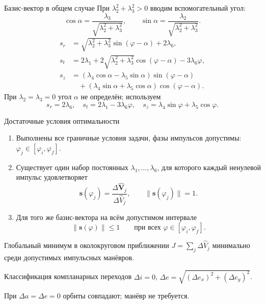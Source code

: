 \documentclass[11pt,aspectratio=169,t]{beamer}
\newcommand{\derivationmathspacing}{%
  \setlength{\abovedisplayskip}{2pt}%
  \setlength{\belowdisplayskip}{3pt}%
  \setlength{\abovedisplayshortskip}{2pt}%
  \setlength{\belowdisplayshortskip}{2pt}%
  \setlength{\jot}{2pt}}
\begin{document}
\begin{frame}{Базис-вектор в общем случае}
\relax
\derivationmathspacing
При $\lambda_2^2+\lambda_3^2>0$ вводим вспомогательный угол:
\[
\cos\alpha=\frac{\lambda_3}{\sqrt{\lambda_2^2+\lambda_3^2}},\qquad
\sin\alpha=\frac{\lambda_2}{\sqrt{\lambda_2^2+\lambda_3^2}}.
\]
\[
\boxed{\begin{aligned}
s_r&=\sqrt{\lambda_2^2+\lambda_3^2}\sin(\varphi-\alpha)+2\lambda_6,\\
s_t&=2\lambda_1+2\sqrt{\lambda_2^2+\lambda_3^2}
              \cos(\varphi-\alpha)-3\lambda_6\varphi,\\
s_z&=(\lambda_4\cos\alpha-\lambda_5\sin\alpha)\sin(\varphi-\alpha)\\
   &\quad+(\lambda_4\sin\alpha+\lambda_5\cos\alpha)\cos(\varphi-\alpha).
\end{aligned}}
\]
При $\lambda_2=\lambda_3=0$ угол $\alpha$ не определён; используем
\[
s_r=2\lambda_6,\quad
s_t=2\lambda_1-3\lambda_6\varphi,\quad
s_z=\lambda_4\sin\varphi+\lambda_5\cos\varphi.
\]
\end{frame}

\begin{frame}{Достаточные условия оптимальности}
\relax
\derivationmathspacing
\begin{enumerate}
\setlength{\itemsep}{2pt}
\item Выполнены все граничные условия задачи, фазы импульсов допустимы:
$\varphi_j\in[\varphi_i,\varphi_f]$.
\item Существует один набор постоянных $\lambda_1,\ldots,\lambda_6$,
для которого каждый ненулевой импульс удовлетворяет
\[
\boldsymbol s(\varphi_j)
 =\frac{\Delta\widehat{\boldsymbol V}_j}{\Delta\widehat V_j},\qquad
\|\boldsymbol s(\varphi_j)\|=1.
\]
\item Для того же базис-вектора на всём допустимом интервале
\[
\|\boldsymbol s(\varphi)\|\leq1
\qquad\text{при всех }\varphi\in[\varphi_i,\varphi_f].
\]
\end{enumerate}
\begin{block}{Глобальный минимум в околокруговом приближении}
$J=\sum_j\Delta\widehat V_j$ минимально среди допустимых импульсных манёвров.
\end{block}
\end{frame}

\begin{frame}{Классификация компланарных переходов}
\relax
\derivationmathspacing
$\Delta i=0$, $\Delta e=\sqrt{(\Delta e_x)^2+(\Delta e_y)^2}$.
\par\smallskip
\centering

\par\smallskip
При $\Delta a=\Delta e=0$ орбиты совпадают; манёвр не требуется.
\end{frame}
\end{document}
